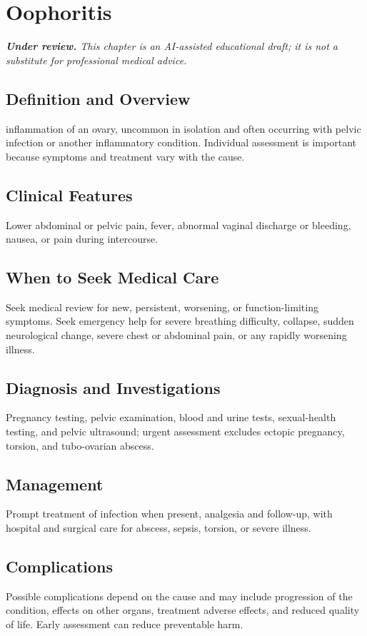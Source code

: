 \chapter{Oophoritis}

\medskip
\noindent\textit{\textbf{Under review.} This chapter is an AI-assisted educational draft; it is not a substitute for professional medical advice.}

\section*{Definition and Overview}
inflammation of an ovary, uncommon in isolation and often occurring with pelvic infection or another inflammatory condition. Individual assessment is important because symptoms and treatment vary with the cause.

\section*{Clinical Features}
Lower abdominal or pelvic pain, fever, abnormal vaginal discharge or bleeding, nausea, or pain during intercourse.

\section*{When to Seek Medical Care}
Seek medical review for new, persistent, worsening, or function-limiting symptoms. Seek emergency help for severe breathing difficulty, collapse, sudden neurological change, severe chest or abdominal pain, or any rapidly worsening illness.

\section*{Diagnosis and Investigations}
Pregnancy testing, pelvic examination, blood and urine tests, sexual-health testing, and pelvic ultrasound; urgent assessment excludes ectopic pregnancy, torsion, and tubo-ovarian abscess.

\section*{Management}
Prompt treatment of infection when present, analgesia and follow-up, with hospital and surgical care for abscess, sepsis, torsion, or severe illness.

\section*{Complications}
Possible complications depend on the cause and may include progression of the condition, effects on other organs, treatment adverse effects, and reduced quality of life. Early assessment can reduce preventable harm.

